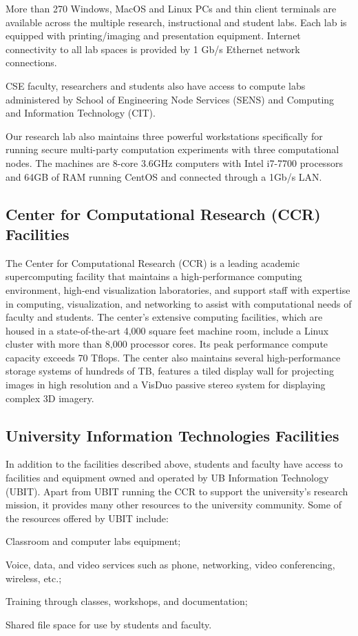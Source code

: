 More than 270 Windows, MacOS and Linux PCs and thin client terminals are
available across the multiple research, instructional and student labs. Each
lab is equipped with printing/imaging and presentation equipment. Internet
connectivity to all lab spaces is provided by 1 Gb/s Ethernet network
connections.

CSE faculty, researchers and students also have access to compute labs
administered by School of Engineering Node Services (SENS) and Computing and
Information Technology (CIT).

Our research lab also maintains three powerful workstations
specifically for running secure multi-party computation experiments
with three computational nodes. The machines are 8-core 3.6GHz
computers with Intel i7-7700 processors and 64GB of RAM running
CentOS and connected through a 1Gb/s LAN.

\subsection*{Center for Computational Research (CCR) Facilities}

The Center for Computational Research (CCR) is a leading academic
supercomputing facility that maintains a high-performance computing
environment, high-end visualization laboratories, and support staff with
expertise in computing, visualization, and networking to assist with
computational needs of faculty and students. The center's extensive
computing facilities, which are housed in a state-of-the-art 4,000 square
feet machine room, include a Linux cluster with more than 8,000 processor
cores. Its peak performance compute capacity exceeds 70 Tflops. The center
also maintains several high-performance storage systems of hundreds of TB,
features a tiled display wall for projecting images in high resolution and a
VisDuo passive stereo system for displaying complex 3D imagery. 

\subsection*{University Information Technologies Facilities}

In addition to the facilities described above, students and faculty have
access to facilities and equipment owned and operated by UB Information
Technology (UBIT). Apart from UBIT running the CCR to support the
university's research mission, it provides many other resources to the
university community. Some of the resources offered by UBIT include:

\medskip 
\begin{compactitem}
  \item Classroom and computer labs equipment;
  \item Voice, data, and video services such as phone, networking, video
    conferencing, wireless, etc.; 
  \item Training through classes, workshops, and documentation;
  \item Shared file space for use by students and faculty.
\end{compactitem}



